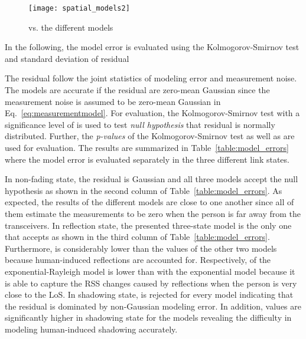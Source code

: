 \documentclass[journal, 10pt, twocolumn, balance]{IEEEtran}
\begin{document}
\begin{figure}[!t]
\begin{centering}
\texttt{[image: spatial\_models2]}
\caption{ vs. the different models} 
\label{fig:model_comparison}
\end{centering}
\end{figure}

In the following, the model error is evaluated using the Kolmogorov-Smirnov test and standard deviation of residual

The residual follow the joint statistics of modeling error and measurement noise. The models are accurate if the residual are zero-mean Gaussian since the measurement noise is assumed to be zero-mean Gaussian in Eq.~\eqref{eq:measurementmodel}. For evaluation, the Kolmogorov-Smirnov test with a significance level of  is used to test \emph{null hypothesis}  that residual is normally distributed. Further, the \emph{p-values} of the Kolmogorov-Smirnov test as well as  are used for evaluation. The results are summarized in Table~\ref{table:model_errors} where the model error is evaluated separately in the three different link states. 

In non-fading state, the residual is Gaussian and all three models accept the null hypothesis as shown in the second column of Table~\ref{table:model_errors}. As expected, the results of the different models are close to one another since all of them estimate the measurements to be zero when the person is far away from the transceivers. In reflection state, the presented three-state model is the only one that accepts  as shown in the third column of Table~\ref{table:model_errors}. Furthermore,  is considerably lower than the values of the other two models because human-induced reflections are accounted for. Respectively,  of the exponential-Rayleigh model is lower than with the exponential model because it is able to capture the RSS changes caused by reflections when the person is very close to the LoS. In shadowing state,  is rejected for every model indicating that the residual is dominated by non-Gaussian modeling error. In addition,  values are significantly higher in shadowing state for the models revealing the difficulty in modeling human-induced shadowing accurately. 
\end{document}
